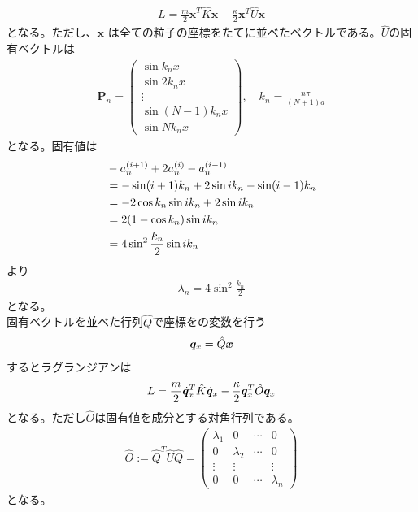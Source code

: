 \documentclass{jsarticle}  %
\numberwithin{equation}{section} %
\numberwithin{figure}{section}
\begin{document}
    \begin{align}
        L = \frac{m}{2} \dot{\bm{x}}^T \hat{K} \dot{\bm{x}} - \frac{\kappa}{2} \bm{x}^T \hat{U} \bm{x} 
    \end{align}
    となる。ただし、$\bm{x}$ は全ての粒子の座標をたてに並べたベクトルである。$\hat{U}$の固有ベクトルは
    \begin{align}
        \bm{P}_n = \left(
        \begin{matrix}
            \sin k_nx\\
            \sin 2k_nx\\
            \vdots \\
            \sin (N-1)k_nx\\
            \sin N k_nx
        \end{matrix}
        \right),\quad k_n = \frac{n \pi}{(N+1)a}
    \end{align}
    となる。固有値は
    \begin{align}
        &-a_n^{(i+1)}+2a_n^{(i)} - a_n^{(i-1)} \notag  \\
        &= -\sin (i+1) k_n +2 \sin i k_n - \sin (i-1) k_n \notag \\
        &= -2\cos k_n \sin i k_n + 2 \sin i k_n \notag \\
        &= 2 (1-\cos k_n)\sin i k_n \notag \\
        &= 4 \sin^2 \frac{k_n}{2}\sin i k_n \notag 
    \end{align}
    より
    \begin{align}
        \lambda_n = 4 \sin^2 \frac{k_n}{2} 
    \end{align}
    となる。\\
    固有ベクトルを並べた行列$\hat{Q}$で座標をの変数を行う
    \begin{align}
        \bm{q}_{x} = \hat{Q} \bm{x} \notag 
    \end{align}
    するとラグランジアンは
    \begin{align}
        L = \frac{m}{2} \dot{\bm{q}}_x^T \hat{K} \dot{\bm{q}}_x  - \frac{\kappa}{2} \bm{q}_x^T \hat{O} \bm{q}_x \notag 
    \end{align}
    となる。ただし$\hat{O}$は固有値を成分とする対角行列である。
    \begin{align}
        \hat{O} := \hat{Q}^T \hat{U} \hat{Q} = \left( 
        \begin{matrix}
            \lambda_1&0&\cdots&0\\
            0&\lambda_2&\cdots&0 \\
            \vdots &\vdots &&\vdots \\
            0&0&\cdots&\lambda_n
        \end{matrix}
        \right)
    \end{align}
    となる。
\end{document}
